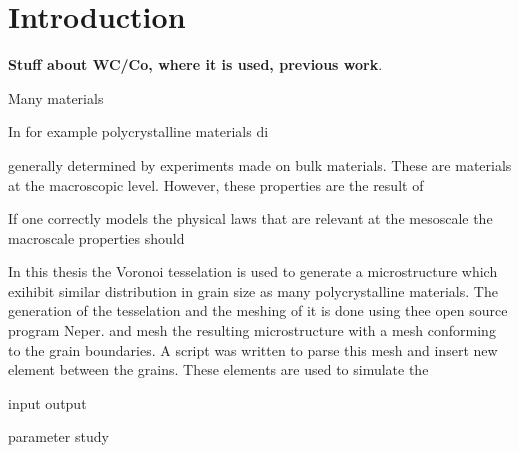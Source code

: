 \documentclass[introduction.tex]{subfiles}
\begin{document}
\chapter{Introduction}

\textbf{Stuff about WC/Co, where it is used, previous work}.

Many materials

In for example polycrystalline materials di


generally determined by experiments made on bulk materials. These are materials at the macroscopic level. However, these properties
are the result of 

If one correctly models the physical laws that are relevant at the mesoscale the macroscale properties should 

In this thesis the Voronoi tesselation is used to generate a microstructure which exihibit similar distribution in grain size as many polycrystalline materials. 
The generation of the tesselation and the meshing of it is done using thee open source program Neper.
 and mesh the resulting microstructure with a mesh conforming to the grain boundaries. A script was written to parse this mesh
 and insert new element between the grains. These elements are used to simulate the 

input
output

parameter study
\end{document}
